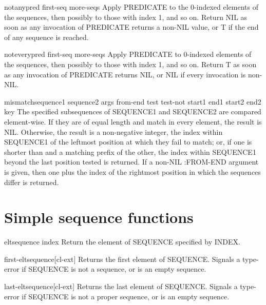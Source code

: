 \documentclass[10pt,english]{book}
\begin{document}
\begin{function}{notany}{pred first-seq \rest more-seqs}
  Apply PREDICATE to the 0-indexed elements of the sequences, then
  possibly to those with index 1, and so on. Return NIL as soon
  as any invocation of PREDICATE returns a non-NIL value, or T if the end
  of any sequence is reached.
\end{function}

\begin{function}{notevery}{pred first-seq \rest more-seqs}
  Apply PREDICATE to 0-indexed elements of the sequences, then
  possibly to those with index 1, and so on. Return T as soon
  as any invocation of PREDICATE returns NIL, or NIL if every invocation
  is non-NIL.
\end{function}

\begin{function}{mismatch}{sequence1 sequence2 \rest args \key from-end test test-not start1 end1 start2
    end2 key}
  The specified subsequences of SEQUENCE1 and SEQUENCE2 are compared
  element-wise. If they are of equal length and match in every element, the
  result is NIL. Otherwise, the result is a non-negative integer, the index
  within SEQUENCE1 of the leftmost position at which they fail to match; or,
  if one is shorter than and a matching prefix of the other, the index within
  SEQUENCE1 beyond the last position tested is returned. If a non-NIL
  :FROM-END argument is given, then one plus the index of the rightmost
  position in which the sequences differ is returned.
\end{function}

\section{Simple sequence functions}
\label{sec:simple-sequ-funct}

\begin{accessor}{elt}{sequence index}
  Return the element of SEQUENCE specified by INDEX.
\end{accessor}

\begin{function}{first-elt}{sequence}[cl-ext]
  Returns the first element of SEQUENCE. Signals a type-error if SEQUENCE is
  not a sequence, or is an empty sequence.
\end{function}

\begin{function}{last-elt}{sequence}[cl-ext]
  Returns the last element of SEQUENCE. Signals a type-error if SEQUENCE is
  not a proper sequence, or is an empty sequence.
\end{function}
\end{document}
